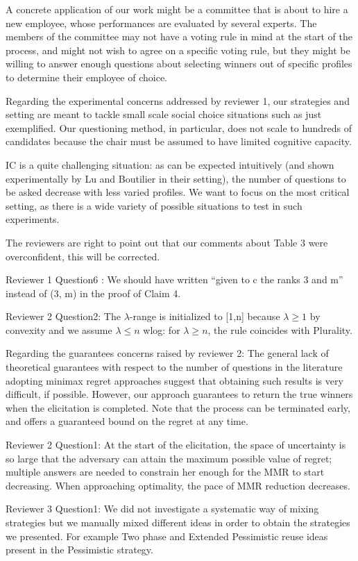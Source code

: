 A concrete application of our work might be a committee that is about to hire a new employee, whose performances are evaluated by several experts. The members of the committee may not have a voting rule in mind at the start of the process, and might not wish to agree on a specific voting rule, but they might be willing to answer enough questions about selecting winners out of specific profiles to determine their employee of choice.

Regarding the experimental concerns addressed by reviewer 1, our strategies and setting are meant to tackle small scale social choice situations such as just exemplified. Our questioning method, in particular, does not scale to hundreds of candidates because the chair must be assumed to have limited cognitive capacity.

IC is a quite challenging situation: as can be expected intuitively (and shown experimentally by Lu and Boutilier in their setting), the number of questions to be asked decrease with less varied profiles. We want to focus on the most critical setting, as there is a wide variety of possible situations to test in such experiments.

The reviewers are right to point out that our comments about Table 3 were overconfident, this will be corrected.

Reviewer 1 Question6 : We should have written “given to c the ranks 3 and m” instead of (3, m) in the proof of Claim 4.

Reviewer 2 Question2: The $\lambda$-range is initialized to [1,n] because $\lambda \geq1$ by convexity and we assume $\lambda \leq n$ wlog: for $\lambda \geq n$, the rule coincides with Plurality.

Regarding the guarantees concerns raised by reviewer 2: The general lack of theoretical guarantees with respect to the number of questions in the literature adopting minimax regret approaches suggest that obtaining such results is very difficult, if possible. However, our approach guarantees to return the true winners when the elicitation is completed. Note that the process can be terminated early, and offers a guaranteed bound on the regret at any time.

Reviewer 2 Question1: At the start of the elicitation, the space of uncertainty is so large that the adversary can attain the maximum possible value of regret; multiple answers are needed to constrain her enough for the MMR to start decreasing. When approaching optimality, the pace of MMR reduction decreases.

Reviewer 3 Question1: We did not investigate a systematic way of mixing strategies but we manually mixed different ideas in order to obtain the strategies we presented. For example Two phase and Extended Pessimistic reuse ideas present in the Pessimistic strategy.